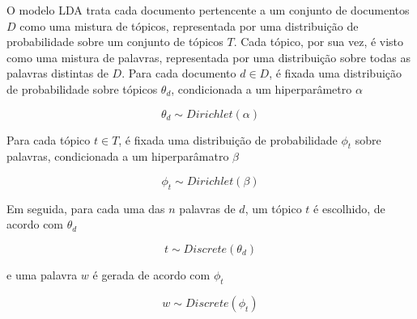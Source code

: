 



O modelo LDA trata cada documento pertencente a um conjunto de documentos \ensuremath{D} como uma mistura de tópicos, representada por uma distribuição de probabilidade sobre um conjunto de tópicos \ensuremath{T}. Cada tópico, por sua vez, é visto como uma mistura de palavras, representada por uma distribuição sobre todas as palavras distintas de \ensuremath{D}. Para cada documento \ensuremath{d \in D}, é fixada uma distribuição de probabilidade sobre tópicos \ensuremath{\theta_d}, condicionada a um hiperparâmetro \ensuremath{\alpha}

\begin{equation}
\label{lda:topic}
\ensuremath{\theta_d \sim Dirichlet(\alpha)}
\end{equation}

Para cada tópico \ensuremath{t \in T}, é fixada uma distribuição de probabilidade \ensuremath{\phi_t} sobre palavras, condicionada a um hiperparâmatro \ensuremath{\beta}

\begin{equation}
\label{lda:word}
\ensuremath{\phi_t \sim Dirichlet(\beta)}
\end{equation}

Em seguida, para cada uma das \ensuremath{n} palavras de \ensuremath{d}, um tópico \ensuremath{t} é escolhido, de acordo com \ensuremath{\theta_d}

\begin{equation}
\label{lda:topic-chosen}
\ensuremath{t \sim Discrete(\theta_d)}
\end{equation}

e uma palavra \ensuremath{w} é gerada de acordo com \ensuremath{\phi_t}

\begin{equation}
\label{lda:word-chosen}
\ensuremath{w \sim Discrete(\phi_t)}
\end{equation}

